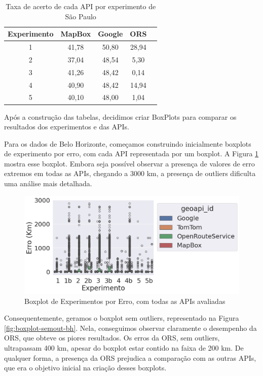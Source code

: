 \begin{table}[!ht]
  \centering
  \caption{Taxa de acerto de cada API por experimento de São Paulo}
  \label{tab:txAcerExpAPISP}
  \begin{adjustbox}{width=0.7\textwidth}
  \begin{tabular}{|c|c|c|c|c|}
  \hline
  Experimento & MapBox & Google & ORS\\
  \hline
  1 & 41,78 & 50,80 & 28,94 \\
  \hline
  2 & 37,04 & 48,54 & 5,30 \\
  \hline
  3 & 41,26 & 48,42 & 0,14 \\
  \hline
  4 & 40,90 & 48,42 & 14,94 \\
  \hline
  5 & 40,10 & 48,00 & 1,04 \\
  \hline
  \end{tabular}
  \end{adjustbox}
  \end{table}

Após a construção das tabelas, decidimos criar BoxPlots para comparar os resultados dos experimentos e das APIs.

Para os dados de Belo Horizonte, começamos construindo inicialmente boxplots de experimento por erro, com cada API representada por um boxplot. A Figura \ref{fig:boxplot-completo-bh} mostra esse boxplot. Embora seja possível observar a presença de valores de erro extremos em todas as APIs, chegando a 3000 km, a presença de outliers dificulta uma análise mais detalhada.

\begin{figure}[h]
    \centering
    \includegraphics[width=\textwidth]{Figuras/boxplotExperimento.png}
    \caption{Boxplot de Experimentos por Erro, com todas as APIs avaliadas}
    \label{fig:boxplot-completo-bh}
\end{figure}

Consequentemente, geramos o boxplot sem outliers, representado na Figura \ref{fig:boxplot-semout-bh}. Nela, conseguimos observar claramente o desempenho da ORS, que obteve os piores resultados. Os erros da ORS, sem outliers, ultrapassam 400 km, apesar do boxplot estar contido na faixa de 200 km. De qualquer forma, a presença da ORS prejudica a comparação com as outras APIs, que era o objetivo inicial na criação desses boxplots.

